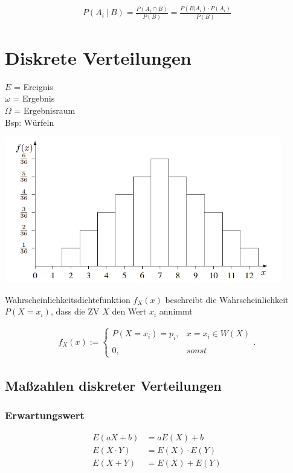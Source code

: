 \documentclass[10pt,a4paper]{article}
\begin{document}
  \begin{mdframed}[style=exercise]
    \begin{align}
        P (A_i \ |\ B) = \frac{P(A_i \cap B)}{P(B)} = \frac{P(B | A_i) \cdot P(A_i)}{P(B)}
    \end{align}
  \end{mdframed}

  \newpage

  \section{Diskrete Verteilungen}
  $E$ = Ereignis\\
  $\omega$ = Ergebnis\\
  $\Omega$ = Ergebnisraum\\

  Bsp: Würfeln
  \begin{center}
      \includegraphics[width=.22\textwidth]{./img/wuerfel.png}
  \end{center}
Wahrscheinlichkeitsdichtefunktion $f_X(x)$ beschreibt die Wahrscheinlichkeit $P(X=x_i)$, 
dass die ZV $X$ den Wert $x_i$ annimmt
  \begin{mdframed}[style=exercise]
    \begin{align}
        f_X(x):=\left\{\begin{array}{ll} P(X=x_i) = p_i,  & x = x_i\in W(X) \\ \\
         0, & sonst\end{array}\right. .
    \end{align}
  \end{mdframed}

\subsection{Maßzahlen diskreter Verteilungen}
\subsubsection{Erwartungswert}
  \begin{mdframed}[style=exercise]
    \begin{align}
        E(aX +b) &= aE(X)+b \\
        E(X \cdot Y) &= E(X) \cdot E(Y)\\
        E(X + Y) &= E(X) + E(Y)
    \end{align}
  \end{mdframed}
\end{document}
